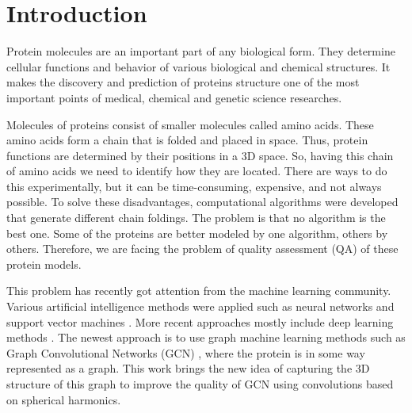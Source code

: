 \documentclass[12pt,twoside]{article}
\title
{Quality prediction of proteins models with spherical convolutions on three-dimensional graphs}
\author
{Nikita Pavlichenko$^1$, Sergei Grudinin$^2$, Ilia Igashov$^{1,2}$.} %
\begin{document}
	
	\maketitle
	
	\section{Introduction}
	Protein molecules are an important part of any biological form. They determine cellular 
	functions and behavior of various biological and chemical structures. It makes the discovery 
	and prediction of proteins structure one of the most important points of medical, chemical 
	and genetic science researches.

	Molecules of proteins consist of smaller molecules called amino acids. These amino acids
	form a chain that is folded and placed in space. Thus, protein functions are determined
	by their positions in a 3D space. So, having this chain of amino acids we need to identify
	how they are located. There are ways to do this experimentally, but it can be time-consuming,
	expensive, and not always possible. To solve these disadvantages, computational algorithms \cite{Arnold2005}\cite{Lundstroem2008}\cite{Xu2019}
	were developed that generate different chain foldings. The problem is that no algorithm is the 
	best one. Some of the proteins are better modeled by one algorithm, others by others. Therefore, we 
	are facing the problem of quality assessment (QA) of these protein models.

	This problem has recently got attention from the machine learning community. Various artificial
	intelligence methods were applied such as neural networks \cite{Wallner2003} and support vector machines \cite{Ray2012}\cite{Uziela2016}.
	More recent approaches mostly include deep learning methods \cite{Hurtado2018}\cite{Derevyanko2018}\cite{Pages2019}\cite{Conover2019}. The newest approach is to use graph
	machine learning methods such as Graph Convolutional Networks (GCN) \cite{Baldassarre2020GRAPHQAPM}, where the protein is in some
	way represented as a graph. This work brings the new idea of capturing the 3D structure of this graph 
	to improve the quality of GCN using convolutions based on spherical harmonics.
\end{document}
